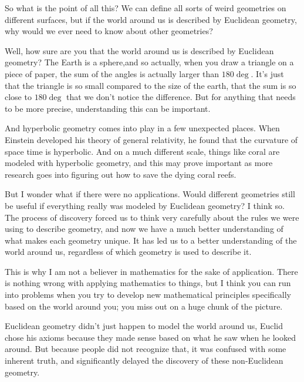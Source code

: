 \documentclass[12pt]{article}
\begin{document}
So what is the point of all this? We can define all sorts of weird geometries on different surfaces, but if the world around us is described by Euclidean geometry, why would we ever need to know about other geometries?

Well, how sure are you that the world around us is described by Euclidean geometry? The Earth is a sphere, and so actually, when you draw a triangle on a piece of paper, the sum of the angles is actually larger than $180\deg$. It's just that the triangle is so small compared to the size of the earth, that the sum is so close to $180\deg$ that we don't notice the difference. But for anything that needs to be more precise, understanding this can be important.

And hyperbolic geometry comes into play in a few unexpected places. When Einstein developed his theory of general relativity, he found that the curvature of space time is hyperbolic. And on a much different scale, things like coral are modeled with hyperbolic geometry, and this may prove important as more research goes into figuring out how to save the dying coral reefs.

But I wonder what if there were no applications. Would different geometries still be useful if everything really was modeled by Euclidean geometry? I think so. The process of discovery forced us to think very carefully about the rules we were using to describe geometry, and now we have a much better understanding of what makes each geometry unique. It has led us to a better understanding of the world around us, regardless of which geometry is used to describe it.

This is why I am not a believer in mathematics for the sake of application. There is nothing wrong with applying mathematics to things, but I think you can run into problems when you try to develop new mathematical principles specifically based on the world around you; you miss out on a huge chunk of the picture.

Euclidean geometry didn't just happen to model the world around us, Euclid chose his axioms because they made sense based on what he saw when he looked around. But because people did not recognize that, it was confused with some inherent truth, and significantly delayed the discovery of these non-Euclidean geometry.

\medskip
\nocite{*}
\printbibliography[title=To Learn More]

\end{document}
